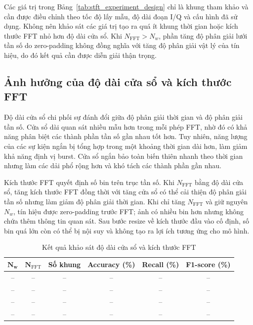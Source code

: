 \documentclass[../DoAn.tex]{subfiles}
\begin{document}
Các giá trị trong Bảng~\ref{tab:stft_experiment_design} chỉ là khung tham khảo và cần được điều chỉnh theo tốc độ lấy mẫu, độ dài đoạn I/Q và cấu hình đã sử dụng. Không nên khảo sát các giá trị tạo ra quá ít khung thời gian hoặc kích thước FFT nhỏ hơn độ dài cửa sổ. Khi $N_{\mathrm{FFT}}>N_w$, phần tăng độ phân giải lưới tần số do zero-padding không đồng nghĩa với tăng độ phân giải vật lý của tín hiệu, do đó kết quả cần được diễn giải thận trọng.

\subsection{Ảnh hưởng của độ dài cửa sổ và kích thước FFT}

Độ dài cửa sổ chi phối sự đánh đổi giữa độ phân giải thời gian và độ phân giải tần số. Cửa sổ dài quan sát nhiều mẫu hơn trong mỗi phép FFT, nhờ đó có khả năng phân biệt các thành phần tần số gần nhau tốt hơn. Tuy nhiên, năng lượng của các sự kiện ngắn bị tổng hợp trong một khoảng thời gian dài hơn, làm giảm khả năng định vị burst. Cửa sổ ngắn bảo toàn biến thiên nhanh theo thời gian nhưng làm các dải phổ rộng hơn và khó tách các thành phần gần nhau.

Kích thước FFT quyết định số bin trên trục tần số. Khi $N_{\mathrm{FFT}}$ bằng độ dài cửa sổ, tăng kích thước FFT đồng thời với tăng cửa sổ có thể cải thiện độ phân giải tần số nhưng làm giảm độ phân giải thời gian. Khi chỉ tăng $N_{\mathrm{FFT}}$ và giữ nguyên $N_w$, tín hiệu được zero-padding trước FFT; ảnh có nhiều bin hơn nhưng không chứa thêm thông tin quan sát. Sau bước resize về kích thước đầu vào cố định, số bin quá lớn còn có thể bị nội suy và không tạo ra lợi ích tương ứng cho mô hình.

\begin{table}[H]
    \centering
    \caption{Kết quả khảo sát độ dài cửa sổ và kích thước FFT}
    \label{tab:stft_window_fft_results}
    \renewcommand{\arraystretch}{1.3}
    \begin{tabular}{|c|c|c|c|c|c|}
        \hline
        $\mathbf{N_w}$ & $\mathbf{N_{\mathrm{FFT}}}$ & \textbf{Số khung} & \textbf{Accuracy (\%)} & \textbf{Recall (\%)} & \textbf{F1-score (\%)} \\ \hline
        -- & -- & -- & -- & -- & -- \\ \hline
        -- & -- & -- & -- & -- & -- \\ \hline
        -- & -- & -- & -- & -- & -- \\ \hline
        -- & -- & -- & -- & -- & -- \\ \hline
    \end{tabular}
\end{table}
\end{document}
